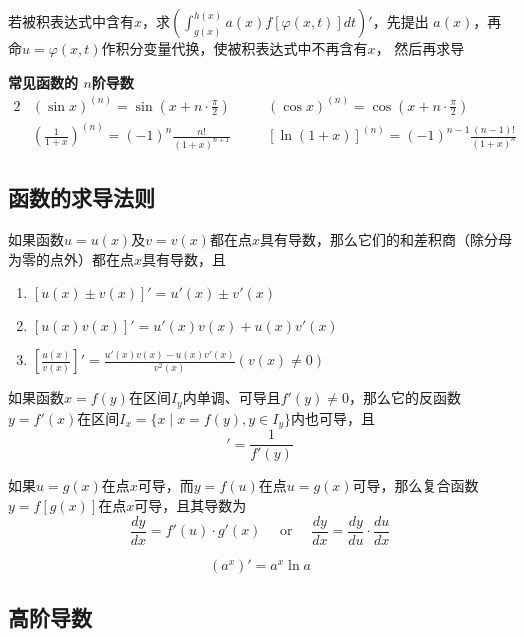 \documentclass[11pt]{article}
\begin{document}
若被积表达式中含有\(x\)，求\((\int_{g(x)}^{h(x)}a(x)f[\varphi(x,t)]dt)'\)，先提出
\(a(x)\)，再命\(u=\varphi(x,t)\)作积分变量代换，使被积表达式中不再含有\(x\)，
然后再求导


\textbf{常见函数的 \(n\)阶导数}
\begin{alignat*}{2}
&(\sin x)^{(n)} = \sin(x+n\cdot\frac{\pi}{2})&&
(\cos x)^{(n)} = \cos(x+n\cdot\frac{\pi}{2})\\
&(\frac{1}{1+x})^{(n)} = (-1)^n\frac{n!}{(1+x)^{n+1}}\quad&&
[\ln(1+x)]^{(n)}=(-1)^{n-1}\frac{(n-1)!}{(1+x)^n}
\end{alignat*}
\subsection{函数的求导法则}
\label{sec:orgd987a7d}
\begin{theorem}[]
如果函数\(u=u(x)\)及\(v=v(x)\)都在点\(x\)具有导数，那么它们的和差积商（除分母
为零的点外）都在点\(x\)具有导数，且
\begin{enumerate}
\item \([u(x)\pm v(x)]'=u'(x)\pm v'(x)\)
\item \([u(x)v(x)]'=u'(x)v(x)+u(x)v'(x)\)
\item \([\frac{u(x)}{v(x)}]'=\frac{u'(x)v(x)-u(x)v'(x)}{v^2(x)}(v(x)\neq0)\)
\end{enumerate}
\end{theorem}

\begin{theorem}[]
如果函数\(x=f(y)\)在区间\(I_y\)内单调、可导且\(f'(y)\neq0\)，那么它的反函数
\(y=f'(x)\)在区间\(I_x=\{x\mid x=f(y),y\in I_y\}\)内也可导，且
\begin{equation*}
[f^{-1}(x)]'=\frac{1}{f'(y)}
\end{equation*}
\end{theorem}

\begin{theorem}[]
如果\(u=g(x)\)在点\(x\)可导，而\(y=f(u)\)在点\(u=g(x)\)可导，那么复合函数
\(y=f[g(x)]\)在点\(x\)可导，且其导数为
\begin{equation*}
\frac{dy}{dx}=f'(u)\cdot g'(x) \quad\text{ or }\quad
\frac{dy}{dx}=\frac{dy}{du}\cdot\frac{du}{dx}
\end{equation*}
\end{theorem}

\begin{equation*}
(a^x)'=a^x\ln a
\end{equation*}
\subsection{高阶导数}
\label{sec:org5582310}
\end{document}
